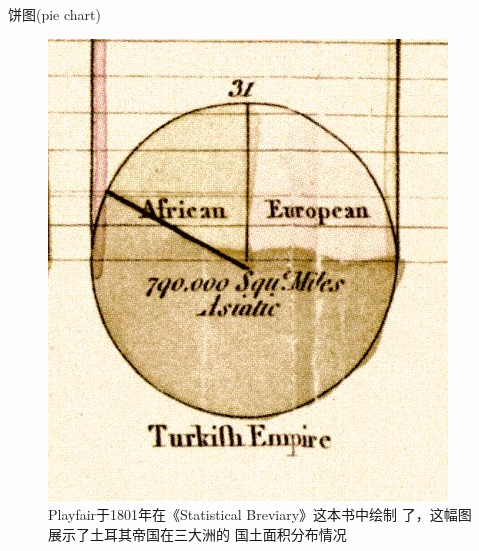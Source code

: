 \documentclass{beamerthemeMono}
\begin{document}
\begin{frame}[c]{饼图(pie chart)}{}

  \begin{figure}
    \begin{columns}
      \begin{column}{.6\textwidth}
        \includegraphics[width=\textwidth]{Playfair_piechart.jpg}
      \end{column}

    \begin{column}{.35\textwidth}
      \centering
      \caption{Playfair于1801年在《Statistical Breviary》这本书中绘制
        了，这幅图展示了土耳其帝国在三大洲的
        国土面积分布情况}
    \end{column}
  \end{columns}
\end{figure}

\end{frame}
\end{document}
